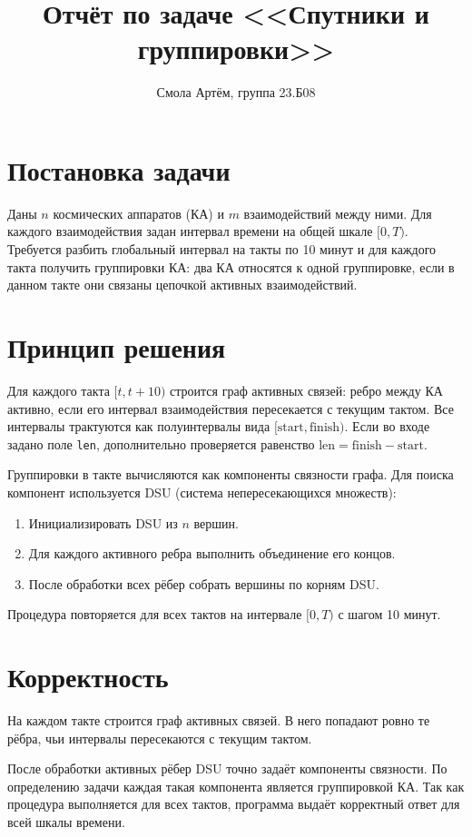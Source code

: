 \documentclass[12pt,a4paper]{article}
\title{Отчёт по задаче <<Спутники и группировки>>}
\author{Смола Артём, группа 23.Б08}
\date{}
\begin{document}
\maketitle

\section{Постановка задачи}
Даны $n$ космических аппаратов (КА) и $m$ взаимодействий между ними.
Для каждого взаимодействия задан интервал времени на общей шкале $[0, T)$.
Требуется разбить глобальный интервал на такты по 10 минут и для каждого такта получить группировки КА:
два КА относятся к одной группировке, если в данном такте они связаны цепочкой активных взаимодействий.

\section{Принцип решения}
Для каждого такта $[t, t+10)$ строится граф активных связей:
ребро между КА активно, если его интервал взаимодействия пересекается с текущим тактом.
Все интервалы трактуются как полуинтервалы вида $[\text{start}, \text{finish})$.
Если во входе задано поле \texttt{len}, дополнительно проверяется равенство
$\text{len} = \text{finish} - \text{start}$.

Группировки в такте вычисляются как компоненты связности графа.
Для поиска компонент используется DSU (система непересекающихся множеств):
\begin{enumerate}
    \item Инициализировать DSU из $n$ вершин.
    \item Для каждого активного ребра выполнить объединение его концов.
    \item После обработки всех рёбер собрать вершины по корням DSU.
\end{enumerate}

Процедура повторяется для всех тактов на интервале $[0, T)$ с шагом 10 минут.

\section{Корректность}
На каждом такте строится граф активных связей.
В него попадают ровно те рёбра, чьи интервалы пересекаются с текущим тактом.

После обработки активных рёбер DSU точно задаёт компоненты связности.
По определению задачи каждая такая компонента является группировкой КА.
Так как процедура выполняется для всех тактов, программа выдаёт корректный ответ для всей шкалы времени.
\end{document}
